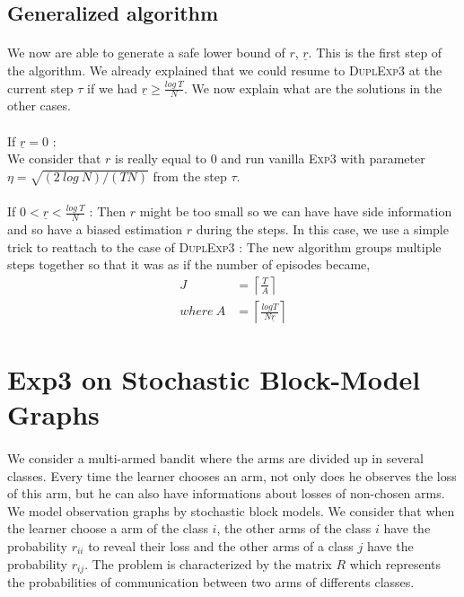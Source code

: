 \documentclass[11pt,a4paper]{article}
\begin{document}
\subsection{Generalized algorithm}
\paragraph{}We now are able to generate a safe lower bound of $r$, $\underline{r}$. This is the first step of the algorithm. We already explained that we could resume to \textsc{DuplExp3} at the current step $\tau$ if we had $ \underline{r} \geq \frac{log\ T}{N}$. We now explain what are the solutions in the other cases.\\

\paragraph{} If $\underline{r}=0$ : \\
We consider that $r$ is really equal to $0$ and run vanilla \textsc{Exp3} with parameter $\eta=\sqrt{\left(2\ log\ N \right)/\left(TN\right)}$ from the step $\tau$.

\paragraph{}If $0< \underline{r} < \frac{log\ T}{N}$ :
Then $r$ might be too small so we can have have side information and so have a biased estimation $r$ during the steps. In this case, we use a simple trick to reattach to the case of \textsc{DuplExp3} : The new algorithm groups multiple steps together so that it was as if the number of episodes became,
\begin{align*}
J &= \left\lceil \frac{T}{A} \right\rceil \\
where\ A & =\left\lceil \frac{log T}{N \underline{r}} \right\rceil
\end{align*}

\section{Exp3 on Stochastic Block-Model Graphs}

\paragraph{}We consider a multi-armed bandit where the arms are divided up in several classes. Every time the learner chooses an arm, not only does he observes the loss of this arm, but he can also have informations about losses of non-chosen arms. We model observation graphs by stochastic block models. We consider that when the learner choose a arm of the class $i$, the other arms of the class $i$ have the probability $r_{ii}$ to reveal their loss and the other arms of a class $j$ have the probability $r_{ij}$. The problem is characterized by the matrix $R$ which represents the probabilities of communication between two arms of differents classes.
\end{document}
